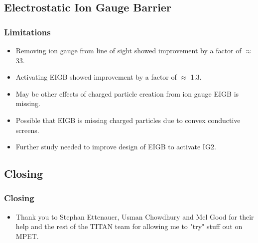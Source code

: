 \documentclass{beamer}
\begin{document}
\subsection{Electrostatic Ion Gauge Barrier}
\frame
{
  \frametitle{Limitations}
  \begin{itemize}
  \item<1> Removing ion gauge from line of sight showed improvement by a factor of $\approx$ 33.
  \item<1> Activating EIGB showed improvement by a factor of $\approx$ 1.3.
  \item<1> May be other effects of charged particle creation from ion gauge EIGB is missing.
  \item<1> Possible that EIGB is missing charged particles due to convex conductive screens.
  \item<1> Further study needed to improve design of EIGB to activate IG2.
  \end{itemize}
}
\subsection{Closing}
\frame
{
  \frametitle{Closing}
  \begin{itemize}
  \item<1> Thank you to Stephan Ettenauer, Usman Chowdhury and Mel Good for their help and the rest of the TITAN team for allowing me to "try" stuff out on MPET.
  \end{itemize}
}
\end{document}
